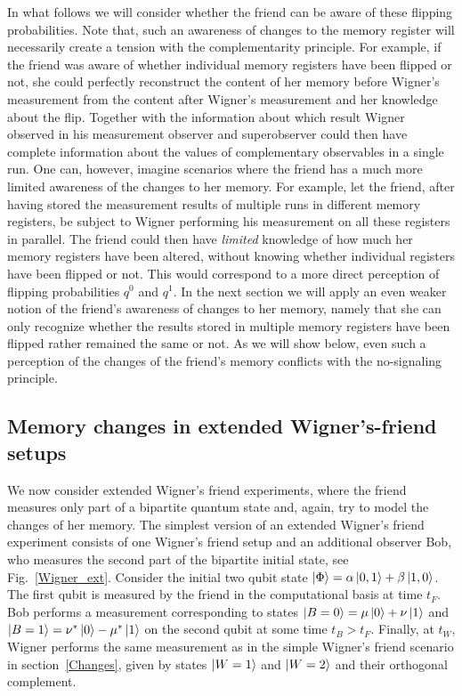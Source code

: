 \documentclass[a4paper,twocolumn,11pt,accepted=2017-05-09,dvipsnames]{quantumarticle}
\numberwithin{equation}{section}
\begin{document}
In what follows we will consider whether the friend can be aware of these flipping probabilities. Note that, {such an awareness of changes to the memory register will necessarily create a tension with the complementarity principle. For example, if the friend} was aware of whether individual memory registers have been flipped or not, she could perfectly reconstruct the content of her memory before Wigner's measurement from the content after Wigner's measurement and her knowledge about the flip. {Together with the information about which result Wigner observed in his measurement observer and superobserver could then have complete information about the values of complementary observables in a single run}. One can, however, imagine scenarios where {the friend has a much more limited awareness of the changes to her memory. For example, let} the friend, after having stored the measurement results of multiple runs in different memory registers, be subject to Wigner performing his measurement on all these registers in parallel. The friend could then have \emph{limited} knowledge of how much her memory registers have been altered, without knowing whether individual registers have been flipped or not. This would correspond to a more direct perception of flipping probabilities $q^0$ and $q^1$. {In the next section we will apply an even weaker notion of the friend's awareness of changes to her memory, namely that she can only recognize whether the results stored in multiple memory registers have been flipped rather remained the same or not.} As we will show below, even such a perception of the changes of the friend's memory conflicts with the no-signaling principle.

\subsection{Memory changes in extended Wigner's-friend setups}
\label{Changes_E}

We now consider extended Wigner's friend experiments, where the friend measures only part of a bipartite quantum state and, again, try to model the changes of her memory. The simplest version of an extended Wigner's friend experiment consists of one Wigner's friend setup and an additional observer Bob, who measures the second part of the bipartite initial state, see Fig.~\ref{Wigner_ext}. Consider the initial two qubit state $\ket{\Phi}= \alpha \ket{0,1} + \beta \ket{1,0}$. The first qubit is measured by the friend in the computational basis at time $t_F$. Bob performs a measurement corresponding to states $\ket{B=0}= \mu \ket{0}+\nu \ket{1}$ and $\ket{B=1}= \nu^* \ket{0}- \mu^* \ket{1}$ on the second qubit at some time $t_B>t_F$. Finally, at $t_W$, Wigner performs the  same measurement as in the simple Wigner's friend scenario in section~\ref{Changes}, given by states $\ket{W=1}$ and $\ket{W=2}$ and their orthogonal complement.\\
\end{document}
